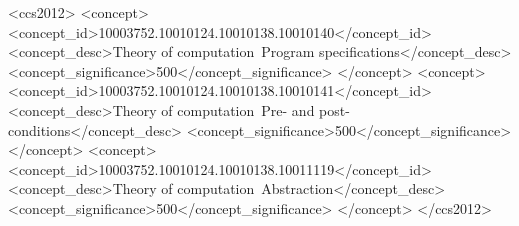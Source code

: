 \documentclass[acmsmall,screen]{acmart}
\begin{document}
\begin{abstract}
\end{abstract}

\ifacm 
\begin{CCSXML}
<ccs2012>
    <concept>
        <concept_id>10003752.10010124.10010138.10010140</concept_id>
        <concept_desc>Theory of computation~Program specifications</concept_desc>
        <concept_significance>500</concept_significance>
        </concept>
    <concept>
        <concept_id>10003752.10010124.10010138.10010141</concept_id>
        <concept_desc>Theory of computation~Pre- and post-conditions</concept_desc>
        <concept_significance>500</concept_significance>
        </concept>
    <concept>
        <concept_id>10003752.10010124.10010138.10011119</concept_id>
        <concept_desc>Theory of computation~Abstraction</concept_desc>
        <concept_significance>500</concept_significance>
        </concept>
    </ccs2012>
\end{CCSXML}



\fi


\ifacm 
\maketitle
\fi
\end{document}
